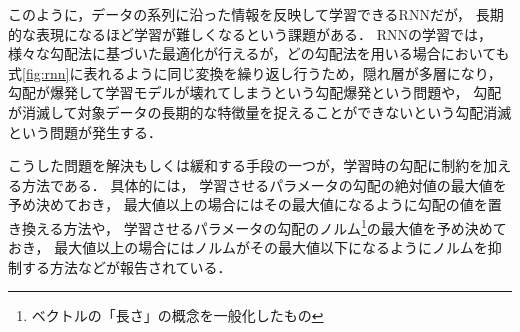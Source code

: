\begin{figure}[htb]
\begin{center}
\hspace*{-40pt}
\end{center}
\end{figure}




このように，データの系列に沿った情報を反映して学習できるRNNだが，
長期的な表現になるほど学習が難しくなるという課題がある\cite{bengio1994learning}．
RNNの学習では，様々な勾配法に基づいた最適化が行えるが，どの勾配法を用いる場合においても
式\ref{fig:rnn}に表れるように同じ変換を繰り返し行うため，隠れ層が多層になり，
勾配が爆発して学習モデルが壊れてしまうという勾配爆発\cite{bengio1994learning,pascanu2013difficulty}という問題や，
勾配が消滅して対象データの長期的な特徴量を捉えることができないという勾配消滅\cite{pascanu2013difficulty, hochreiter1998vanishing}という問題が発生する．

こうした問題を解決もしくは緩和する手段の一つが，学習時の勾配に制約を加える方法である．
具体的には，
学習させるパラメータの勾配の絶対値の最大値を予め決めておき，
最大値以上の場合にはその最大値になるように勾配の値を置き換える方法\cite{mikolov2012statistical}や，
学習させるパラメータの勾配のノルム\footnote{ベクトルの「長さ」の概念を一般化したもの}の最大値を予め決めておき，
最大値以上の場合にはノルムがその最大値以下になるようにノルムを抑制する方法\cite{pascanu2013difficulty}などが報告されている．


